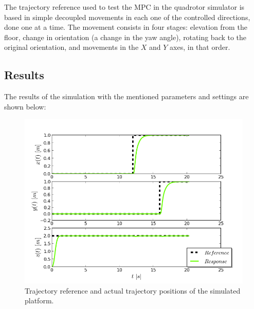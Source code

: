 The trajectory reference used to test the MPC in the quadrotor simulator is based in simple decoupled movements in each one of the controlled directions, done one at a time. The movement consists in four stages: elevation from the floor, change in orientation (a change in the yaw angle), rotating back to the original orientation, and movements in the $X$ and $Y$ axes, in that order.

\subsection{Results}

The results of the simulation with the mentioned parameters and settings are shown below:\\

\begin{figure}[H]
\centering
\includegraphics[scale=0.7]{Images/Chapter5/ardrone/position_control.png}
\caption{Trajectory reference and actual trajectory positions of the simulated platform.}
\label{fig:ardrone_pos}
\end{figure}

